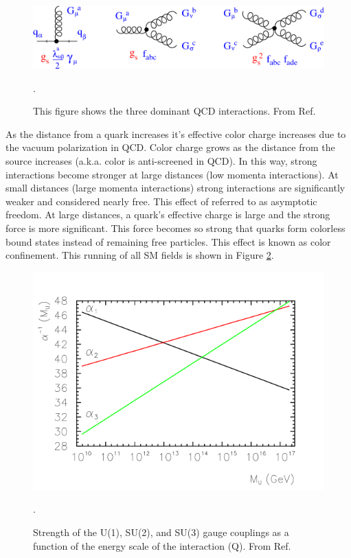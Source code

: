 \begin{figure}[h!]
  \centering
  \includegraphics[width=\hsize]{figures/Theory/QCD_vertices.png}
  \caption{This figure shows the three dominant QCD interactions. From Ref. \cite{pich}}. 
  \label{fig:QCDinteractions}
\end{figure}
\FloatBarrier


As the distance from a quark increases it's effective color charge increases due to the vacuum polarization in QCD. Color charge grows as the distance from the source increases (a.k.a. color is anti-screened in QCD).  In this way, strong interactions become stronger at large distances (low momenta interactions).  At small distances (large momenta interactions) strong interactions are significantly weaker and considered nearly free. This effect of referred to as asymptotic freedom. At large distances, a quark's effective charge is large and the strong force is more significant. This force becomes so strong that quarks form colorless bound states instead of remaining free particles. This effect is known as color confinement. This running of all SM fields is shown in Figure \ref{fig:sm_couplings}. 

\begin{figure}[h!]
  \centering
  \includegraphics[width=\hsize]{figures/Theory/runningcouplings.png}
  \caption{Strength of the U(1), SU(2), and SU(3) gauge couplings as a function of the energy scale of the interaction (Q). From Ref. \cite{runningcouplings}}. 
  \label{fig:sm_couplings}
\end{figure}
\FloatBarrier


